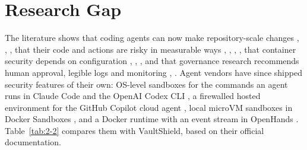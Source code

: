 \documentclass[12pt,a4paper,oneside]{report}
\begin{document}
\addtocounter{table}{-1}
\par\medskip

\endgroup

\section{Research Gap}\label{research-gap}

The literature shows that coding agents can now make repository-scale changes \cite{ref2}, \cite{ref3}, \cite{ref4}, that their code and actions are risky in measurable ways \cite{ref5}, \cite{ref6}, \cite{ref7}, \cite{ref8}, that container security depends on configuration \cite{ref11}, \cite{ref12}, \cite{ref13}, and that governance research recommends human approval, legible logs and monitoring \cite{ref9}, \cite{ref10}. Agent vendors have since shipped security features of their own: OS-level sandboxes for the commands an agent runs in Claude Code \cite{ref16} and the OpenAI Codex CLI \cite{ref18}, a firewalled hosted environment for the GitHub Copilot cloud agent \cite{ref19}, local microVM sandboxes in Docker Sandboxes \cite{ref20}, and a Docker runtime with an event stream in OpenHands \cite{ref21}. Table~\ref{tab:2-2} compares them with VaultShield, based on their official documentation.
\end{document}
